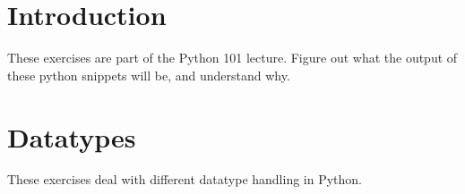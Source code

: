 \documentclass[draft=false]{article}
\begin{document}
\thispagestyle{empty}


\section*{Introduction}

These exercises are part of the Python 101 lecture. Figure out what the output of these python snippets will be, and understand why.

\setlength{\columnsep}{3em}

\section{Datatypes}

These exercises deal with different datatype handling in Python.
\end{document}
